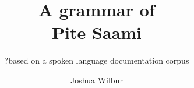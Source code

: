 



\title{A grammar of \\ Pite Saami}%
\subtitle{?based on a spoken language documentation corpus}  
\author{Joshua Wilbur}
\dedication{Muv vienagijda Árjepluovest} 
\renewcommand{\lsBackBody}{This grammar of \PS\ (Uralic; Sweden) is a grammar of \PS.}%
\renewcommand{\lsBackTitle}{Biddumsáme giella}%



\maketitle  
\frontmatter 

\tableofcontents

\cleardoublepage{}%
\listoffigures

\cleardoublepage{}%
\listoftables

\cleardoublepage{}%

\cleardoublepage{}%

%
\cleardoublepage%

\mainmatter

%

%


%







